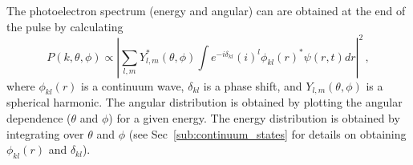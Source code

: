 The photoelectron spectrum (energy and angular) can are obtained at the end of the pulse by calculating
\begin{equation}
    P(k,\theta,\phi) \propto \left|\sum_{l,m} Y_{l,m}^*(\theta,\phi)\int  e^{-i\delta_{kl}}(i)^l \phi_{kl}(r)^* \psi(r,t) dr \right|^2\, ,
\end{equation}
where $\phi_{kl}(r)$ is a continuum wave, $\delta_{kl}$ is a phase shift, and $Y_{l,m}(\theta,\phi)$ is a spherical harmonic. The angular distribution is obtained by plotting the angular dependence ($\theta$ and $\phi$) for a given energy. The energy distribution is obtained by integrating over $\theta$ and $\phi$ (see Sec~\ref{sub:continuum_states} for details on obtaining $\phi_{kl}(r)$ and $\delta_{kl}$).



